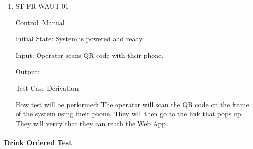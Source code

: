\documentclass[12pt, titlepage]{article}
\begin{document}
\begin{enumerate}

\item{ST-FR-WAUT-01\\}

Control: Manual
					
Initial State: System is powered and ready.
					
Input: Operator scans QR code with their phone.
					
Output: 

Test Case Derivation: 
					
How test will be performed: The operator will scan the QR code on the frame of the system using their phone. They will then go to the link that pops up. They will verify that they can reach the Web App.
\end{enumerate}

\paragraph{Drink Ordered Test}
\end{document}
